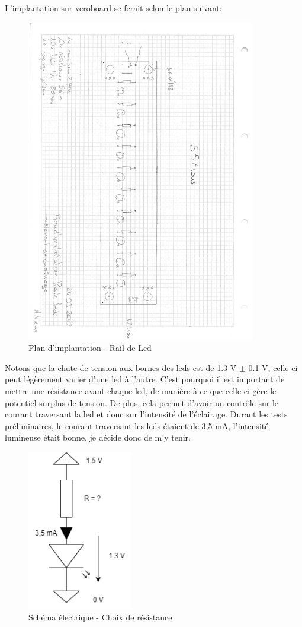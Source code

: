 L'implantation sur veroboard se ferait selon le plan suivant:
\begin{figure}[H]
    \centering
    \includegraphics[width=10cm, trim=0 0 3cm 1cm, clip]{assets/figures/plan_implantation_rail_led.pdf}
    \caption{Plan d'implantation - Rail de Led}
\end{figure}

Notons que la chute de tension aux bornes des leds est de 1.3 V $\pm$ 0.1 V, celle-ci peut légèrement varier d'une led à l'autre. C'est
pourquoi il est important de mettre une résistance avant chaque led, de manière à ce que celle-ci gère le potentiel surplus de tension.
De plus, cela permet d'avoir un contrôle sur le courant traversant la led et donc sur l'intensité de l'éclairage. Durant les tests préliminaires,
le courant traversant les leds étaient de 3,5 \si{\milli\A}, l'intensité lumineuse était bonne, je décide donc de m'y tenir.

\begin{figure}[H]
    \centering
    \includegraphics[height=7cm]{assets/figures/schema_led_res.png}
    \caption{Schéma électrique - Choix de résistance}
\end{figure}

